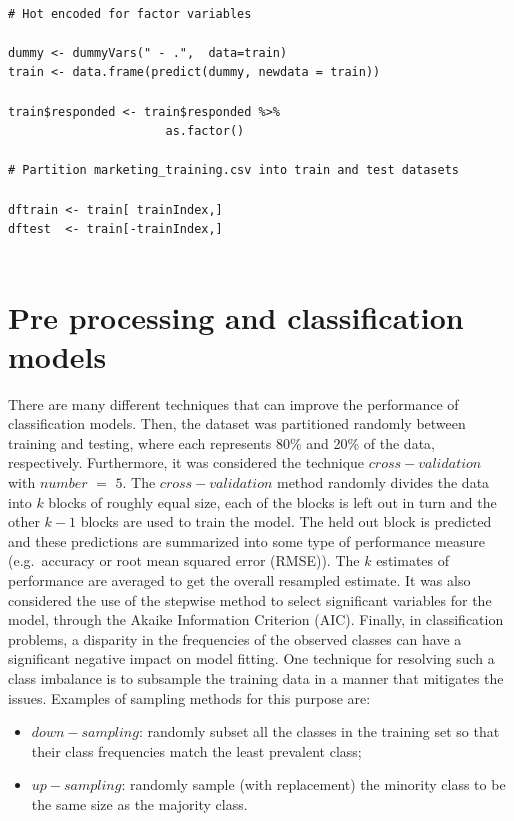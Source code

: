 \documentclass[12pt,]{article}
\begin{document}
\begin{lstlisting}[frame=single,framerule=0pt,framesep=8pt, basicstyle=\tiny]

# Hot encoded for factor variables

dummy <- dummyVars(" - .",  data=train)
train <- data.frame(predict(dummy, newdata = train)) 

train$responded <- train$responded %>% 
                      as.factor()

# Partition marketing_training.csv into train and test datasets

dftrain <- train[ trainIndex,]
dftest  <- train[-trainIndex,]


\end{lstlisting}

\hypertarget{pre-processing-and-classification-models}{%
\section{Pre processing and classification
models}\label{pre-processing-and-classification-models}}

\quad There are many different techniques that can improve the
performance of classification models. Then, the dataset was partitioned
randomly between training and testing, where each represents 80\% and
20\% of the data, respectively. Furthermore, it was considered the
technique \(cross-validation\) with \(number\) \(=\) \(5\). The
\(cross-validation\) method randomly divides the data into \(k\) blocks
of roughly equal size, each of the blocks is left out in turn and the
other \(k-1\) blocks are used to train the model. The held out block is
predicted and these predictions are summarized into some type of
performance measure (e.g.~accuracy or root mean squared error (RMSE)).
The \(k\) estimates of performance are averaged to get the overall
resampled estimate. It was also considered the use of the stepwise
method to select significant variables for the model, through the Akaike
Information Criterion (AIC). Finally, in classification problems, a
disparity in the frequencies of the observed classes can have a
significant negative impact on model fitting. One technique for
resolving such a class imbalance is to subsample the training data in a
manner that mitigates the issues. Examples of sampling methods for this
purpose are:

\begin{itemize}
   \item $down-sampling$: randomly subset all the classes in the training set so that their class frequencies match the least prevalent class;
   \item $up-sampling$: randomly sample (with replacement) the minority class to be the same size as the majority class.
\end{itemize}
\end{document}

